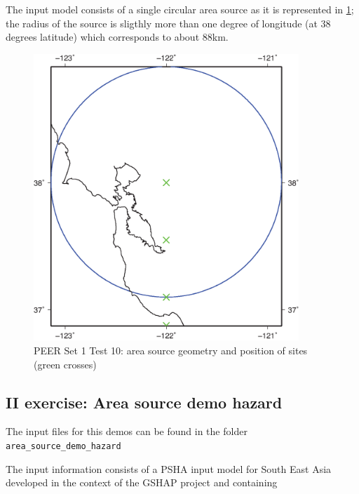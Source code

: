 The input model consists of a single circular area source as it is 
represented in \ref{fig:demo_peer_set1_test10}; the radius of the source 
is sligthly more than one degree of longitude (at 38 degrees latitude) 
which corresponds to about 88km. 
\begin{figure}[htbp]
\begin{center}
\includegraphics[width=10cm]{./figures/peer_set1_test10/peerSet1test10a.eps}
\caption{PEER Set 1 Test 10: area source geometry and position of sites (green
    crosses)}
\label{fig:demo_peer_set1_test10}
\end{center}
\end{figure}

\clearpage
\subsection{II exercise: Area source demo hazard}
%
The input files for this demos can be found in the folder 
\texttt{area\_source\_demo\_hazard}

The input information consists of a PSHA input model for South East Asia 
developed in the context of the GSHAP project and containing 
\cleardoublepage
